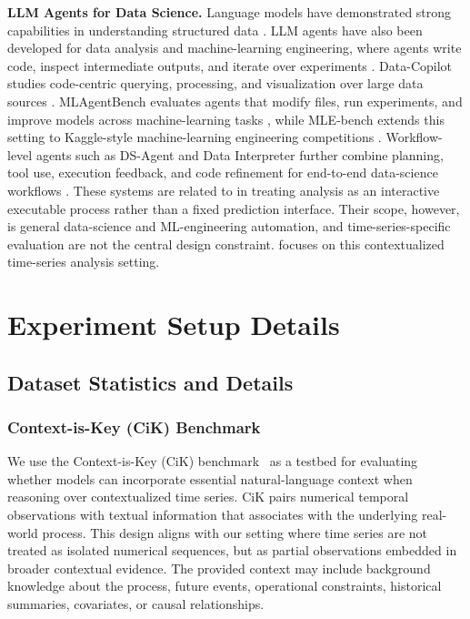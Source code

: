 \textbf{LLM Agents for Data Science.}
Language models have demonstrated strong capabilities in understanding structured data \citep{li2025can, zou2025rag, ning2025graph4mm}.
LLM agents have also been developed for data analysis and machine-learning engineering, where agents write code, inspect intermediate outputs, and iterate over experiments \citep{kong2026ai, li2026heterogeneous, zhao2026papermindbenchmarkingagenticreasoning}. Data-Copilot studies code-centric querying, processing, and visualization over large data sources \citep{zhang2023datacopilot}. MLAgentBench evaluates agents that modify files, run experiments, and improve models across machine-learning tasks \citep{huang2023mlagentbench}, while MLE-bench extends this setting to Kaggle-style machine-learning engineering competitions \citep{chan2025mlebench}. Workflow-level agents such as DS-Agent and Data Interpreter further combine planning, tool use, execution feedback, and code refinement for end-to-end data-science workflows \citep{guo2024dsagent,hong-etal-2025-data}. These systems are related to \method in treating analysis as an interactive executable process rather than a fixed prediction interface. Their scope, however, is general data-science and ML-engineering automation, and time-series-specific evaluation are not the central design constraint. \method focuses on this contextualized time-series analysis setting.



\section{Experiment Setup Details}
\label{ap:exp_details}



\subsection{Dataset Statistics and Details}
\label{ap:dataset_details}





\subsubsection{Context-is-Key (CiK) Benchmark}

We use the Context-is-Key (CiK) benchmark~\citep{DBLP:conf/icml/WilliamsAMZSRRL25} as a testbed for evaluating whether models can incorporate essential natural-language context when reasoning over contextualized time series. CiK pairs numerical temporal observations with textual information that associates with the underlying real-world process. This design aligns with our setting where time series are not treated as isolated numerical sequences, but as partial observations embedded in broader contextual evidence. The provided context may include background knowledge about the process, future events, operational constraints, historical summaries, covariates, or causal relationships.

